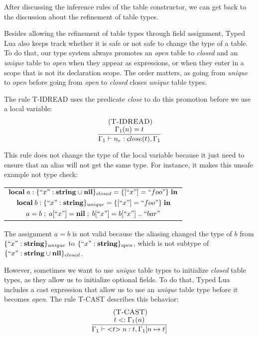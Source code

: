 After discussing the inference rules of the table constructor,
we can get back to the discussion about the refinement of table types.

Besides allowing the refinement of table types through field assignment,
Typed Lua also keeps track whether it is safe or not safe to change the
type of a table.
To do that, our type system always promotes an \emph{open}
table to \emph{closed} and an \emph{unique} table to \emph{open}
when they appear as expressions, or when they enter in a scope that is
not its declaration scope.
The order matters, as going from \emph{unique} to \emph{open}
before going from \emph{open} to \emph{closed} closes \emph{unique} table types.

The rule \textsc{T-IDREAD} uses the predicate \emph{close} to do
this promotion before we use a local variable:
\[
\begin{array}{c}
\; (\textsc{T-IDREAD})\\
\dfrac{\Gamma_{1}(n) = t}
      {\Gamma_{1} \vdash n_{e}:close(t), \Gamma_{1}}
\end{array}
\]

This rule does not change the type of the local variable because it
just need to ensure that an alias will not get the same type.
For instance, it makes this unsafe example not type check:
\begin{center}
\begin{tabular}{lll}
\multicolumn{3}{l}{$\mathbf{local} \; a:\{``x":\mathbf{string} \cup \mathbf{nil}\}_{closed} = \{ [``x"] = ``foo" \} \; \mathbf{in}$}\\
& \multicolumn{2}{l}{$\mathbf{local} \; b:\{``x":\mathbf{string} \}_{unique} = \{ [``x"] = ``foo" \} \; \mathbf{in}$}\\
& & \multicolumn{1}{l}{$a = b \;;\; a[``x"] = \mathbf{nil} \;;\; b[``x"] = b[``x"] \;{..}\; ``bar"$}
\end{tabular}
\end{center}

The assignment $a = b$ is not valid because the aliasing changed the
type of $b$ from $\{``x":\mathbf{string}\}_{unique}$ to $\{``x":\mathbf{string}\}_{open}$,
which is not subtype of $\{``x":\mathbf{string} \cup \mathbf{nil}\}_{closed}$.

However, sometimes we want to use \emph{unique} table types to initialize
\emph{closed} table types, as they allow us to initialize optional fields.
To do that, Typed Lua includes a cast expression that allow us
to use an \emph{unique} table type before it becomes \emph{open}.
The rule \textsc{T-CAST} describes this behavior:
\[
\begin{array}{c}
\; (\textsc{T-CAST})\\
\dfrac{t <: \Gamma_{1}(n)}
      {\Gamma_{1} \vdash {<}t{>} \; n:t, \Gamma_{1}[n \mapsto t]}
\end{array}
\]

